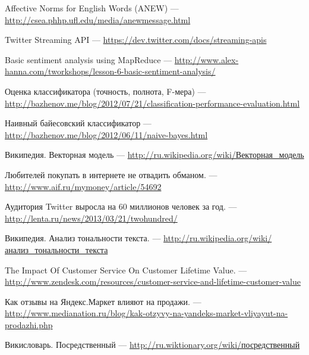 Affective Norms for English Words (ANEW) --- \url{http://csea.phhp.ufl.edu/media/anewmessage.html}

Twitter Streaming API --- \url{https://dev.twitter.com/docs/streaming-apis}

Basic sentiment analysis using MapReduce --- \url{http://www.alex-hanna.com/tworkshops/lesson-6-basic-sentiment-analysis/}

Оценка классификатора (точность, полнота, F-мера) --- \url{http://bazhenov.me/blog/2012/07/21/classification-performance-evaluation.html}

Наивный байесовский классификатор --- \url{http://bazhenov.me/blog/2012/06/11/naive-bayes.html}

Википедия. Векторная модель --- \href{http://ru.wikipedia.org/wiki/%D0%92%D0%B5%D0%BA%D1%82%D0%BE%D1%80%D0%BD%D0%B0%D1%8F_%D0%BC%D0%BE%D0%B4%D0%B5%D0%BB%D1%8C}{http://ru.wikipedia.org/wiki/Векторная\_модель}

Любителей покупать в интернете не отвадить обманом. --- \url{http://www.aif.ru/mymoney/article/54692}

Аудитория Twitter выросла на 60 миллионов человек за год. --- \url{http://lenta.ru/news/2013/03/21/twohundred/}

Википедия. Анализ тональности текста. --- \href{http://ru.wikipedia.org/wiki/%D0%90%D0%BD%D0%B0%D0%BB%D0%B8%D0%B7_%D1%82%D0%BE%D0%BD%D0%B0%D0%BB%D1%8C%D0%BD%D0%BE%D1%81%D1%82%D0%B8_%D1%82%D0%B5%D0%BA%D1%81%D1%82%D0%B0}{http://ru.wikipedia.org/wiki/анализ\_тональности\_текста}

The Impact Of Customer Service On Customer Lifetime Value. --- \url{http://www.zendesk.com/resources/customer-service-and-lifetime-customer-value}

Как отзывы на Яндекс.Маркет влияют на продажи. --- \url{http://www.medianation.ru/blog/kak-otzyvy-na-yandeks-market-vliyayut-na-prodazhi.php}

Викисловарь. Посредственный --- \href{http://ru.wiktionary.org/wiki/%D0%BF%D0%BE%D1%81%D1%80%D0%B5%D0%B4%D1%81%D1%82%D0%B2%D0%B5%D0%BD%D0%BD%D1%8B%D0%B9}{http://ru.wiktionary.org/wiki/посредственный}